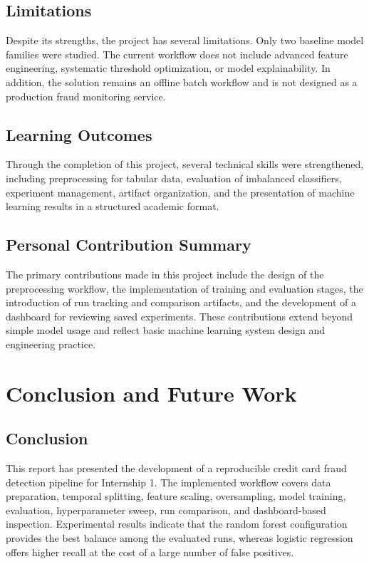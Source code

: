 \documentclass[12pt,a4paper]{report}
\begin{document}
\section{Limitations}
Despite its strengths, the project has several limitations. Only two baseline model families were studied. The current workflow does not include advanced feature engineering, systematic threshold optimization, or model explainability. In addition, the solution remains an offline batch workflow and is not designed as a production fraud monitoring service.

\section{Learning Outcomes}
Through the completion of this project, several technical skills were strengthened, including preprocessing for tabular data, evaluation of imbalanced classifiers, experiment management, artifact organization, and the presentation of machine learning results in a structured academic format.

\section{Personal Contribution Summary}
The primary contributions made in this project include the design of the preprocessing workflow, the implementation of training and evaluation stages, the introduction of run tracking and comparison artifacts, and the development of a dashboard for reviewing saved experiments. These contributions extend beyond simple model usage and reflect basic machine learning system design and engineering practice.

\chapter{Conclusion and Future Work}
\section{Conclusion}
This report has presented the development of a reproducible credit card fraud detection pipeline for Internship 1. The implemented workflow covers data preparation, temporal splitting, feature scaling, oversampling, model training, evaluation, hyperparameter sweep, run comparison, and dashboard-based inspection. Experimental results indicate that the random forest configuration provides the best balance among the evaluated runs, whereas logistic regression offers higher recall at the cost of a large number of false positives.
\end{document}
